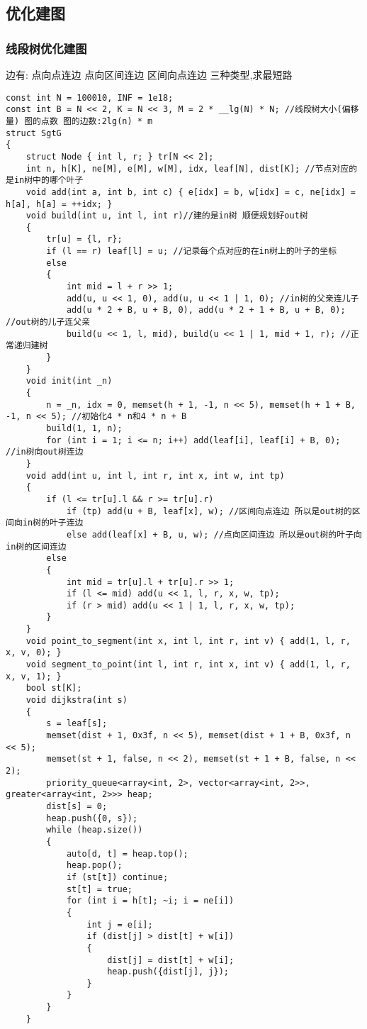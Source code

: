 \documentclass[a4paper,fontset=none]{ctexart}
\begin{document}
\subsection{优化建图}
\subsubsection{线段树优化建图}

边有: \quad 点向点连边 \quad 点向区间连边 \quad 区间向点连边 \quad 三种类型,求最短路


\begin{verbatim}
const int N = 100010, INF = 1e18;
const int B = N << 2, K = N << 3, M = 2 * __lg(N) * N; //线段树大小(偏移量) 图的点数 图的边数:2lg(n) * m
struct SgtG
{
    struct Node { int l, r; } tr[N << 2];
    int n, h[K], ne[M], e[M], w[M], idx, leaf[N], dist[K]; //节点对应的是in树中的哪个叶子
    void add(int a, int b, int c) { e[idx] = b, w[idx] = c, ne[idx] = h[a], h[a] = ++idx; }
    void build(int u, int l, int r)//建的是in树 顺便规划好out树
    {
        tr[u] = {l, r};
        if (l == r) leaf[l] = u; //记录每个点对应的在in树上的叶子的坐标
        else
        {
            int mid = l + r >> 1;
            add(u, u << 1, 0), add(u, u << 1 | 1, 0); //in树的父亲连儿子
            add(u * 2 + B, u + B, 0), add(u * 2 + 1 + B, u + B, 0); //out树的儿子连父亲
            build(u << 1, l, mid), build(u << 1 | 1, mid + 1, r); //正常递归建树
        }
    }
    void init(int _n)
    {
        n = _n, idx = 0, memset(h + 1, -1, n << 5), memset(h + 1 + B, -1, n << 5); //初始化4 * n和4 * n + B
        build(1, 1, n);
        for (int i = 1; i <= n; i++) add(leaf[i], leaf[i] + B, 0); //in树向out树连边
    }
    void add(int u, int l, int r, int x, int w, int tp)
    {
        if (l <= tr[u].l && r >= tr[u].r)
            if (tp) add(u + B, leaf[x], w); //区间向点连边 所以是out树的区间向in树的叶子连边
            else add(leaf[x] + B, u, w); //点向区间连边 所以是out树的叶子向in树的区间连边
        else
        {
            int mid = tr[u].l + tr[u].r >> 1;
            if (l <= mid) add(u << 1, l, r, x, w, tp);
            if (r > mid) add(u << 1 | 1, l, r, x, w, tp);
        }
    }
    void point_to_segment(int x, int l, int r, int v) { add(1, l, r, x, v, 0); }
    void segment_to_point(int l, int r, int x, int v) { add(1, l, r, x, v, 1); }
    bool st[K];
    void dijkstra(int s)
    {
        s = leaf[s];
        memset(dist + 1, 0x3f, n << 5), memset(dist + 1 + B, 0x3f, n << 5);
        memset(st + 1, false, n << 2), memset(st + 1 + B, false, n << 2);
        priority_queue<array<int, 2>, vector<array<int, 2>>, greater<array<int, 2>>> heap;
        dist[s] = 0;
        heap.push({0, s});
        while (heap.size())
        {
            auto[d, t] = heap.top();
            heap.pop();
            if (st[t]) continue;
            st[t] = true;
            for (int i = h[t]; ~i; i = ne[i])
            {
                int j = e[i];
                if (dist[j] > dist[t] + w[i])
                {
                    dist[j] = dist[t] + w[i];
                    heap.push({dist[j], j});
                }
            }
        }
    }


\end{verbatim}
\end{document}
